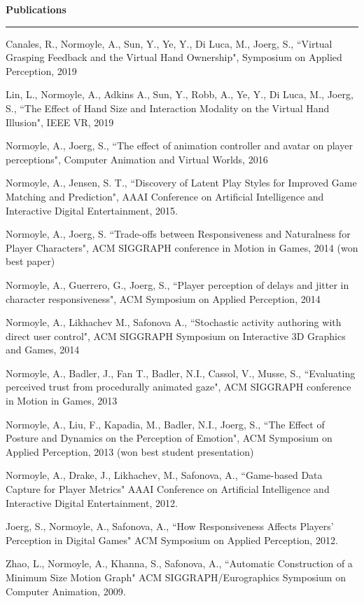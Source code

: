 {\Large {\bf  Publications}}
\vspace{0.1cm}
\hrule
\medskip

Canales, R., Normoyle, A., Sun, Y., Ye, Y., Di Luca, M., Joerg, S., ``Virtual Grasping Feedback and the Virtual Hand Ownership", Symposium on Applied Perception, 2019 

Lin, L., Normoyle, A., Adkins A., Sun, Y., Robb, A., Ye, Y., Di Luca, M., Joerg, S., ``The Effect of Hand Size and Interaction Modality on the Virtual Hand Illusion", IEEE VR, 2019

Normoyle, A., Joerg, S., ``The effect of animation controller and avatar on player perceptions", 
Computer Animation and Virtual Worlds, 2016 

Normoyle, A., Jensen, S. T., ``Discovery of Latent Play Styles for Improved Game Matching and Prediction", 
AAAI Conference on Artificial Intelligence and Interactive Digital Entertainment, 2015.

Normoyle, A., Joerg, S. ``Trade-offs between Responsiveness and Naturalness for Player Characters", 
ACM SIGGRAPH conference in Motion in Games, 2014 (won best paper)

Normoyle, A., Guerrero, G., Joerg, S., ``Player perception of delays and jitter in character responsiveness", 
ACM Symposium on Applied Perception, 2014 

Normoyle, A., Likhachev M., Safonova A., ``Stochastic activity authoring with direct user control", 
ACM SIGGRAPH Symposium on Interactive 3D Graphics and Games, 2014 

Normoyle, A., Badler, J., Fan T., Badler, N.I., Cassol, V., Musse, S., ``Evaluating perceived trust from procedurally animated gaze", ACM SIGGRAPH conference in Motion in Games, 2013 

Normoyle, A., Liu, F., Kapadia, M., Badler, N.I., Joerg, S., ``The Effect of Posture and Dynamics on the Perception of Emotion", ACM Symposium on Applied Perception, 2013 (won best student presentation)

Normoyle, A., Drake, J., Likhachev, M., Safonova, A., ``Game-based Data Capture for Player Metrics" 
AAAI Conference on Artificial Intelligence and Interactive Digital Entertainment, 2012.

Joerg, S., Normoyle, A., Safonova, A., ``How Responsiveness Affects Players' Perception in Digital Games" 
ACM Symposium on Applied Perception, 2012.

Zhao, L., Normoyle, A., Khanna, S., Safonova, A., ``Automatic Construction of a Minimum Size Motion Graph" ACM SIGGRAPH/Eurographics Symposium on Computer Animation, 2009.

